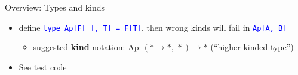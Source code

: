 \documentclass[english]{beamer}
\begin{document}
\begin{frame}{Overview: Types and kinds}
\begin{itemize}
\begin{itemize}
and the \texttt{\textcolor{blue}{\footnotesize{}T}} are types of different
\textbf{kinds} ($*\rightarrow*$ and $*$ resp.)
\item define \texttt{\textcolor{blue}{\footnotesize{}type Ap{[}F{[}\_{]},
T{]} = F{[}T{]}}}, then wrong kinds will fail in \texttt{\textcolor{blue}{\footnotesize{}Ap{[}A,
B{]}}}{\footnotesize \par}
\begin{itemize}
\item suggested \textbf{kind} notation:{\footnotesize{} $\text{Ap}:(*\rightarrow*,\,*)\rightarrow*$
}(``higher-kinded type'')
\end{itemize}
\item See test code
\end{itemize}
\end{itemize}
\end{frame}
\end{document}
